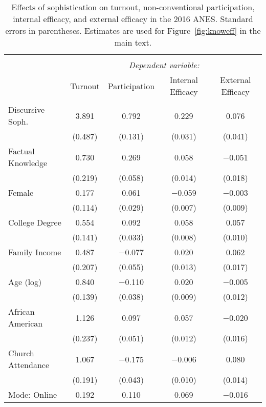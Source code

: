 
\begin{table}[!htbp] \centering 
  \caption[Effects of sophistication on turnout, non-conventional participation, internal efficacy, 
  and external efficacy in the 2016 ANES]{Effects of sophistication on turnout, non-conventional participation, internal efficacy, 
          and external efficacy in the 2016 ANES. Standard errors in parentheses. Estimates are used for
          Figure~\ref{fig:knoweff} in the main text.} 
  \label{tab:knoweff2016} 
\begin{tabular}{@{\extracolsep{0pt}}lcccc} 
\\[-1.8ex]\hline 
\hline \\[-1.8ex] 
 & \multicolumn{4}{c}{\textit{Dependent variable:}} \\ 
\cline{2-5} 
 & Turnout & Participation & Internal Efficacy & External Efficacy \\ 
\hline \\[-1.8ex] 
 Discursive Soph. & 3.891 & 0.792 & 0.229 & 0.076 \\ 
  & (0.487) & (0.131) & (0.031) & (0.041) \\ 
  Factual Knowledge & 0.730 & 0.269 & 0.058 & $-$0.051 \\ 
  & (0.219) & (0.058) & (0.014) & (0.018) \\ 
  Female & 0.177 & 0.061 & $-$0.059 & $-$0.003 \\ 
  & (0.114) & (0.029) & (0.007) & (0.009) \\ 
  College Degree & 0.554 & 0.092 & 0.058 & 0.057 \\ 
  & (0.141) & (0.033) & (0.008) & (0.010) \\ 
  Family Income & 0.487 & $-$0.077 & 0.020 & 0.062 \\ 
  & (0.207) & (0.055) & (0.013) & (0.017) \\ 
  Age (log) & 0.840 & $-$0.110 & 0.020 & $-$0.005 \\ 
  & (0.139) & (0.038) & (0.009) & (0.012) \\ 
  African American & 1.126 & 0.097 & 0.057 & $-$0.020 \\ 
  & (0.237) & (0.051) & (0.012) & (0.016) \\ 
  Church Attendance & 1.067 & $-$0.175 & $-$0.006 & 0.080 \\ 
  & (0.191) & (0.043) & (0.010) & (0.014) \\ 
  Mode: Online & 0.192 & 0.110 & 0.069 & $-$0.016 \\ 

\end{tabular}
\end{table}

